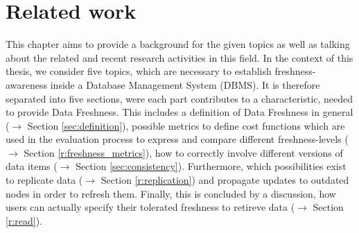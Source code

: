 
\chapter{Related work}
\label{c:related}



This chapter aims to provide a background for the given topics as well as talking about the related and recent research 
activities in this field. In the context of this thesis, we consider five topics, which are necessary to establish 
freshness-awareness inside a Database Management System (DBMS).
It is therefore separated into five sections, were each part contributes to a characteristic, needed to 
provide Data Freshness. This includes a definition of Data Freshness in general ($\rightarrow$ Section \ref{sec:definition}), 
possible metrics to define cost functions which are used
in the evaluation process to express and compare different freshness-levels ($\rightarrow$ Section \ref{r:freshness_metrics}), 
how to correctly involve different versions of data items ($\rightarrow$ Section \ref{sec:consistency}). 
Furthermore, which possibilities exist to replicate data ($\rightarrow$ Section \ref{r:replication}) 
and propagate updates to outdated nodes in order to refresh them.
Finally, this is concluded by a discussion, how users can actually specify their tolerated freshness to retireve data ($\rightarrow$ Section \ref{r:read}).




